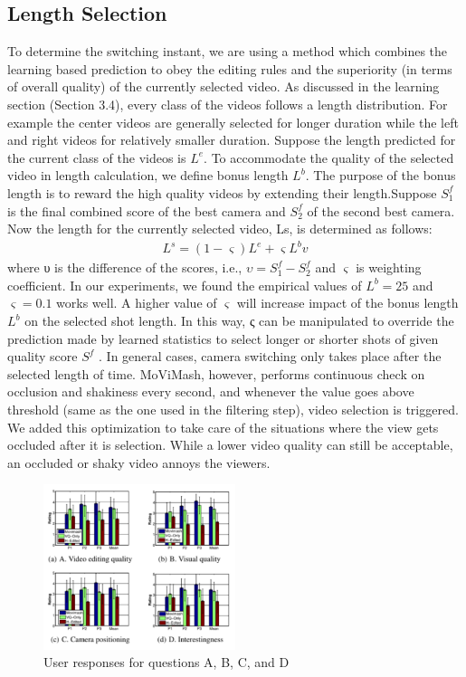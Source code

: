 \documentclass{sig-alternate}
\begin{document}
    \subsection{Length Selection}
    To determine the switching instant, we are using a method which combines the learning based prediction to obey the editing rules and the superiority (in terms of overall quality) of the currently selected video. As discussed in the learning section (Section 3.4), every class of the videos follows a length distribution. For example the center videos are generally selected for longer duration while the left and right videos for relatively smaller duration. Suppose the length predicted for the current class of the videos is $L^e$. To accommodate the quality of the selected video in length calculation, we define bonus length $L^b$. The purpose of the bonus length is to reward the high quality videos by extending their length.Suppose $S^f_1$ is the final combined score of the best camera and $S^f_2$ of the second best camera. Now the length for the currently selected video, Ls, is determined as follows:
    \begin{align}
        L^s = (1- \varsigma )L^e + \varsigma L^bv
    \end{align}
    where υ is the difference of the scores, i.e., $υ =S^f_1 −S^f_2$ and $\varsigma$ is weighting coefficient. In our experiments, we found the empirical values of $L^b = 25$ and $\varsigma = 0.1$ works well. A higher value of $\varsigma$ will increase impact of the bonus length $L^b$ on the selected shot length. In this way, ς can be manipulated to override the prediction made by learned statistics to select longer or shorter shots of given quality score $S^f$ .
    In general cases, camera switching only takes place after the selected length of time. MoViMash, however, performs continuous check on occlusion and shakiness every second, and whenever the value goes above threshold (same as the one used in the filtering step), video selection is triggered. We added this optimization to take care of the situations where the view gets occluded after it is selection. While a lower video quality can still be acceptable, an occluded or shaky video annoys the viewers.
    
    \begin{figure}[h]
    \centering
    \includegraphics[width=0.5\textwidth]{img7.png}
    \caption{User responses for questions A, B, C, and D}
    \label{fig:mesh7}
\end{figure}
\end{document}
